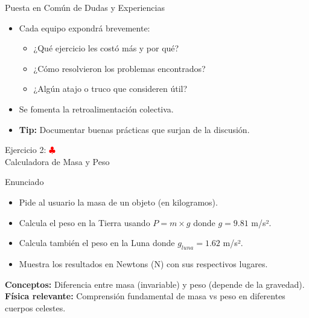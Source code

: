 \documentclass[10pt]{beamer}
\begin{document}
\begin{frame}{Puesta en Común de Dudas y Experiencias}
  \begin{itemize}
    \item Cada equipo expondrá brevemente:
      \begin{itemize}
        \item ¿Qué ejercicio les costó más y por qué?
        \item ¿Cómo resolvieron los problemas encontrados?
        \item ¿Algún atajo o truco que consideren útil?
      \end{itemize}
    \item Se fomenta la retroalimentación colectiva.
    \item \textbf{Tip:} Documentar buenas prácticas que surjan de la discusión.
  \end{itemize}
\end{frame}


\begin{frame}{Ejercicio 2: \hfill \textcolor{red}{$\clubsuit$}\\ Calculadora de Masa y Peso}
  \begin{block}{Enunciado}
    \begin{itemize}
      \item Pide al usuario la masa de un objeto (en kilogramos).
      \item Calcula el peso en la Tierra usando \(P = m \times g\) donde \(g = 9.81\) m/s².
      \item Calcula también el peso en la Luna donde \(g_{luna} = 1.62\) m/s².
      \item Muestra los resultados en Newtons (N) con sus respectivos lugares.
    \end{itemize}
  \end{block}
  \textbf{Conceptos:} Diferencia entre masa (invariable) y peso (depende de la gravedad).
  \\
  \textbf{Física relevante:} Comprensión fundamental de masa vs peso en diferentes cuerpos celestes.
\end{frame}
\end{document}
